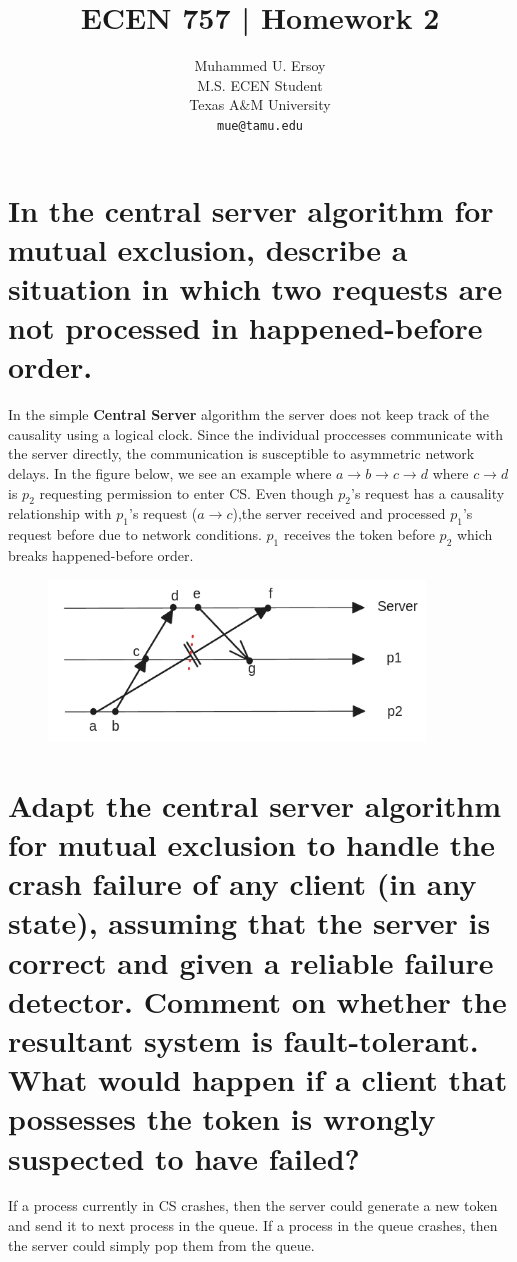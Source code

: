 \documentclass{article}
\title{ECEN 757 | Homework 2}
\author{%
  Muhammed U. Ersoy\\
  M.S. ECEN Student\\
  Texas A\&M University\\
  \texttt{mue@tamu.edu} \\
 }
\begin{document}
\maketitle
\section{In the central server algorithm for mutual exclusion, describe a situation in which two
requests are not processed in happened-before order.}

In the simple \textbf{Central Server} algorithm the server does not keep track of the causality using a logical clock. Since the individual proccesses
communicate with the server directly, the communication is susceptible to asymmetric network delays. In the figure below, we 
see an example where $a \rightarrow b \rightarrow c \rightarrow d$ where $c \rightarrow d$ is $p_2$ requesting permission to enter CS. Even though $p_2$'s request has a causality
relationship with $p_1$'s request ($a \rightarrow c$),the server received and processed $p_1$'s request before due to network conditions. $p_1$ receives the token before $p_2$ which breaks
happened-before order.

\begin{figure}[H]
    \centering
    \includegraphics[width=10cm]{mutual_exclusion_me3.png}
    \caption{}
\end{figure}

\section{Adapt the central server algorithm for mutual exclusion to handle the crash failure of any
client (in any state), assuming that the server is correct and given a reliable failure
detector. Comment on whether the resultant system is fault-tolerant. What would
happen if a client that possesses the token is wrongly suspected to have failed?}

If a process currently in CS crashes, then the server could generate a new token and send it to next process
in the queue.
If a process in the queue crashes, then the server could simply pop them from the queue.
\end{document}
